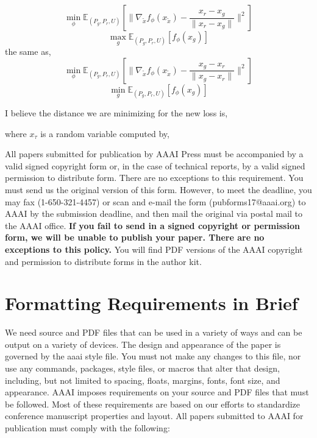 \documentclass[letterpaper]{article} %
\begin{document}
\begin{equation}\label{D}
  \min_{\phi} \mathbb{E}_{(P_g,P_r,U)}[\|\nabla_{\tilde{x}}f_{\phi}(x_{\tilde{x}})-\frac{x_{r}-x_{g}}{\|x_{r}-x_{g}\|}\|^2]
\end{equation}
\begin{equation}\label{G}
  \max_{g} \mathbb{E}_{(P_g,P_r,U)}[f_{\phi}(x_g)]
\end{equation}
the same as,
\begin{equation}\label{D}
  \min_{\phi} \mathbb{E}_{(P_g,P_r,U)}[\|\nabla_{\tilde{x}}f_{\phi}(x_{\tilde{x}})-\frac{x_{g}-x_{r}}{\|x_{g}-x_{r}\|}\|^2]
\end{equation}
\begin{equation}\label{G}
  \min_{g} \mathbb{E}_{(P_g,P_r,U)}[f_{\phi}(x_g)]
\end{equation}

I believe the distance we are minimizing for the new loss is,

where $x_{\tau}$ is a random variable computed by,




All papers submitted for publication by AAAI Press must be accompanied by a valid signed copyright form or, in the case of technical reports, by a valid signed permission to distribute form. There are no exceptions to this requirement. You must send us the original version of this form. However, to meet the deadline, you may fax (1-650-321-4457) or scan and e-mail the form (pubforms17@aaai.org) to AAAI by the submission deadline, and then mail the original via postal mail to the AAAI office. \textbf{If you fail to send in a signed copyright or permission form, we will be unable to publish your paper. There are no exceptions to this policy.} You will find PDF versions of the AAAI copyright and permission to distribute forms in the author kit.

\section{Formatting Requirements in Brief}
We need source and PDF files that can be used in a variety of ways and can be output on a variety of devices. The design and appearance of the paper is governed by the aaai style file. You must not make any changes to this file, nor use any commands, packages, style files, or macros that alter that design, including, but not limited to spacing, floats, margins, fonts, font size, and appearance. AAAI imposes  requirements on your source and PDF files that must be followed. Most of these requirements are based on our efforts to standardize conference manuscript properties and layout. All papers submitted to AAAI for publication must comply with the following:
\end{document}
